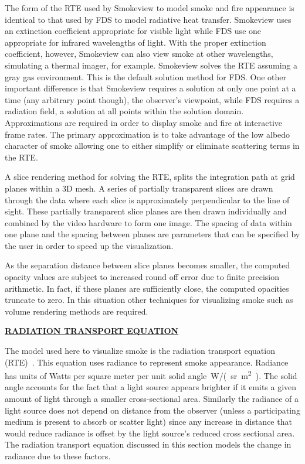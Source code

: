 \documentclass[11pt]{article}
\newcommand{\ssection}[1]{\underline{\bf #1}}
\begin{document}
The form of the RTE used by Smokeview to model smoke and fire
appearance is identical to that used by FDS to model radiative
heat transfer. Smokeview uses an extinction coefficient
appropriate for visible light while FDS use one appropriate for
infrared wavelengths of light.  With the proper extinction
coefficient, however, Smokeview can also view smoke at other
wavelengths, simulating a thermal imager, for example. Smokeview
solves the RTE assuming a gray gas environment. This is the
default solution method for FDS. One other important difference is
that Smokeview requires a solution at only one point at a time
(any arbitrary point though), the observer's viewpoint, while FDS
requires a radiation field, a solution at all points within the
solution domain.
Approximations are
required in order to display smoke and fire at interactive frame
rates.  The primary approximation is to take advantage of the low
albedo character of smoke allowing one to either simplify or
eliminate scattering terms in the RTE.

A slice rendering method for solving the RTE,  splits the
integration path at grid planes within a 3D mesh.
A series of partially transparent slices are drawn through the data where each
slice is approximately perpendicular to the line of sight.
These partially transparent slice planes are then drawn
individually and combined by the video hardware to form one image.
The spacing of data within one plane and the spacing between planes are parameters
that can be specified by the user in order to speed up the visualization.

As the separation distance between slice planes becomes smaller, the
computed opacity values are subject to increased round off error
due to finite precision arithmetic.  In fact, if these planes are
sufficiently close, the computed opacities truncate to zero.   In
this situation other techniques for visualizing smoke such as volume rendering methods are required.


\ssection{RADIATION TRANSPORT EQUATION}

The model used here to visualize smoke is the radiation transport
equation (RTE)~\cite{Siegel:2001}.  This equation uses radiance to
represent smoke appearance.  Radiance has units of Watts per
square meter per unit solid angle~\si{W/(sr.m^2)}.  The solid
angle accounts for the fact that a light source appears brighter
if it emits a given amount of light through a smaller
cross-sectional area.  Similarly the radiance of a light source does not
depend on distance from the
observer (unless a participating medium is present to absorb or
scatter  light) since any increase in distance that would reduce radiance is offset
by the light source's reduced cross sectional area.
The radiation transport equation discussed in
this section models the change in radiance due to these factors.
\end{document}
